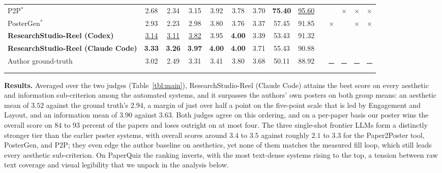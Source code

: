 \documentclass{article}
\newcommand{\reelword}{\textcolor{msred}{R}\textcolor{msgreen}{e}\textcolor{msblue}{e}\textcolor{msyellow}{l}}
\providecommand{\cmark}{\textcolor{teal}{\checkmark}}
\providecommand{\xmark}{\textcolor{red!65!black}{\ensuremath{\times}}}
\providecommand{\dnmark}{\textcolor{gray}{\rule[0.45ex]{1.3ex}{0.13ex}}}
\begin{document}
\begin{table}[!t]
{\begin{tabular}{l ccc ccc cc c cccc}
P2P$^{\ast}$ \citep{p2p} & 2.68 & 2.34 & 3.15 & 3.92 & 3.78 & 3.70 & \textbf{75.40} & \underline{95.60} && \cmark & \xmark & \xmark & \xmark \\
PosterGen$^{\ast}$ \citep{postergen} & 2.93 & 2.23 & 2.98 & 3.80 & 3.76 & 3.37 & 57.45 & 91.85 && \xmark & \cmark & \xmark & \xmark \\
\textbf{ResearchStudio-\reelword{} (Codex)} & \underline{3.14} & \underline{3.11} & \underline{3.82} & 3.95 & \textbf{4.00} & 3.39 & 53.43 & 91.32 && \cmark & \cmark & \cmark & \cmark \\
\textbf{ResearchStudio-\reelword{} (Claude Code)} & \textbf{3.33} & \textbf{3.26} & \textbf{3.97} & \textbf{4.00} & \textbf{4.00} & 3.71 & 55.43 & 90.88 && \cmark & \cmark & \cmark & \cmark \\
\midrule
Author ground-truth & 3.02 & 2.49 & 3.31 & 3.41 & 3.80 & 3.68 & 50.11 & 88.92 && \dnmark & \dnmark & \dnmark & \dnmark \\
\bottomrule
\end{tabular}%
}
\end{table}

\textbf{Results.} Averaged over the two judges (Table~\ref{tbl:main}), ResearchStudio-\reelword{} (Claude Code) attains the best score on every aesthetic and information sub-criterion among the automated systems, and it surpasses the authors' own posters on both group means: an aesthetic mean of $3.52$ against the ground truth's $2.94$, a margin of just over half a point on the five-point scale that is led by Engagement and Layout, and an information mean of $3.90$ against $3.63$. Both judges agree on this ordering, and on a per-paper basis our poster wins the overall score on $84$ to $93$ percent of the papers and loses outright on at most four. The three single-shot frontier LLMs form a distinctly stronger tier than the earlier poster systems, with overall scores around $3.4$ to $3.5$ against roughly $2.1$ to $3.3$ for the Paper2Poster tool, PosterGen, and P2P; they even edge the author baseline on aesthetics, yet none of them matches the measured fill loop, which still leads every aesthetic sub-criterion. On PaperQuiz the ranking inverts, with the most text-dense systems rising to the top, a tension between raw text coverage and visual legibility that we unpack in the analysis below.
\end{document}
